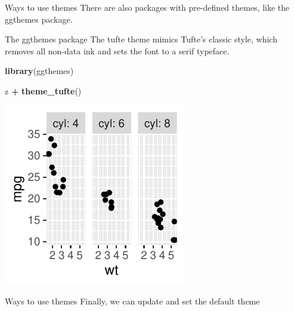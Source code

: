 \documentclass[
  ignorenonframetext,
]{beamer}
\newenvironment{Shaded}{\begin{snugshade}}{\end{snugshade}}
\newcommand{\FunctionTok}[1]{\textcolor[rgb]{0.13,0.29,0.53}{\textbf{#1}}}
\newcommand{\NormalTok}[1]{#1}
\newcommand{\SpecialCharTok}[1]{\textcolor[rgb]{0.81,0.36,0.00}{\textbf{#1}}}
\begin{document}
\begin{frame}{Ways to use themes}
\label{ways-to-use-themes-2}
There are also packages with pre-defined themes, like the ggthemes
package.
\end{frame}

\begin{frame}[fragile]{The ggthemes package}
\label{the-ggthemes-package}
The tufte theme mimics Tufte's classic style, which removes all non-data
ink and sets the font to a serif typeface.

\begin{Shaded}
\begin{Highlighting}[]
\FunctionTok{library}\NormalTok{(ggthemes)}

\NormalTok{z }\SpecialCharTok{+} \FunctionTok{theme\_tufte}\NormalTok{()}
\end{Highlighting}
\end{Shaded}

\begin{center}\includegraphics[width=0.5\linewidth]{Figs/unnamed-chunk-83-1} \end{center}
\end{frame}

\begin{frame}{Ways to use themes}
\label{ways-to-use-themes-3}
Finally, we can update and set the default theme
\end{frame}
\end{document}
